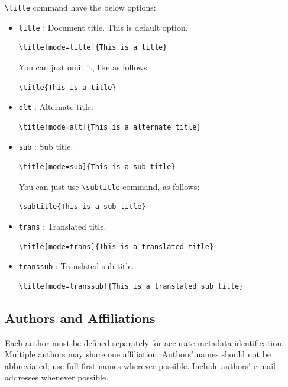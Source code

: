 \documentclass[%
twocolumn
]{ceurart}
\begin{document}
\verb|\title|
command have the below options:
\begin{itemize}
\item
\verb|title|
: Document title. This is default option.
\begin{lstlisting}[language={[latex]TeX}]
\title[mode=title]{This is a title}
\end{lstlisting}

You can just omit it, like as follows:
\begin{lstlisting}[language={[latex]TeX}]
\title{This is a title}
\end{lstlisting}

\item
\verb|alt|
: Alternate title.
\begin{lstlisting}[language={[latex]TeX}]
\title[mode=alt]{This is a alternate title}
\end{lstlisting}

\item
\verb|sub|
: Sub title.
\begin{lstlisting}[language={[latex]TeX}]
\title[mode=sub]{This is a sub title}
\end{lstlisting}
You can just use
\verb|\subtitle|
 command, as follows:
\begin{lstlisting}[language={[latex]TeX}]
\subtitle{This is a sub title}
\end{lstlisting}

\item
\verb|trans|
: Translated title.
\begin{lstlisting}[language={[latex]TeX}]
\title[mode=trans]{This is a translated title}
\end{lstlisting}

\item
\verb|transsub|
: Translated sub title.
\begin{lstlisting}[language={[latex]TeX}]
\title[mode=transsub]{This is a translated sub title}
\end{lstlisting}
\end{itemize}

\subsection{Authors and Affiliations}

Each author must be defined separately for accurate metadata identification.
Multiple authors may share one affiliation.
Authors' names should not be abbreviated; use full first names wherever possible.
Include authors' e-mail addresses whenever possible.
\end{document}
